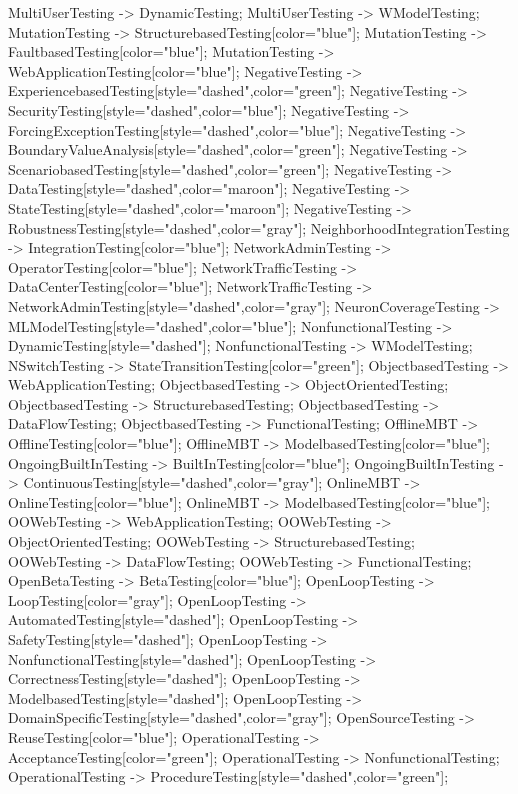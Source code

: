 \documentclass{article}
\begin{document}
{MultiUserTesting -> DynamicTesting;
MultiUserTesting -> WModelTesting;
MutationTesting -> StructurebasedTesting[color="blue"];
MutationTesting -> FaultbasedTesting[color="blue"];
MutationTesting -> WebApplicationTesting[color="blue"];
NegativeTesting -> ExperiencebasedTesting[style="dashed",color="green"];
NegativeTesting -> SecurityTesting[style="dashed",color="blue"];
NegativeTesting -> ForcingExceptionTesting[style="dashed",color="blue"];
NegativeTesting -> BoundaryValueAnalysis[style="dashed",color="green"];
NegativeTesting -> ScenariobasedTesting[style="dashed",color="green"];
NegativeTesting -> DataTesting[style="dashed",color="maroon"];
NegativeTesting -> StateTesting[style="dashed",color="maroon"];
NegativeTesting -> RobustnessTesting[style="dashed",color="gray"];
NeighborhoodIntegrationTesting -> IntegrationTesting[color="blue"];
NetworkAdminTesting -> OperatorTesting[color="blue"];
NetworkTrafficTesting -> DataCenterTesting[color="blue"];
NetworkTrafficTesting -> NetworkAdminTesting[style="dashed",color="gray"];
NeuronCoverageTesting -> MLModelTesting[style="dashed",color="blue"];
NonfunctionalTesting -> DynamicTesting[style="dashed"];
NonfunctionalTesting -> WModelTesting;
NSwitchTesting -> StateTransitionTesting[color="green"];
ObjectbasedTesting -> WebApplicationTesting;
ObjectbasedTesting -> ObjectOrientedTesting;
ObjectbasedTesting -> StructurebasedTesting;
ObjectbasedTesting -> DataFlowTesting;
ObjectbasedTesting -> FunctionalTesting;
OfflineMBT -> OfflineTesting[color="blue"];
OfflineMBT -> ModelbasedTesting[color="blue"];
OngoingBuiltInTesting -> BuiltInTesting[color="blue"];
OngoingBuiltInTesting -> ContinuousTesting[style="dashed",color="gray"];
OnlineMBT -> OnlineTesting[color="blue"];
OnlineMBT -> ModelbasedTesting[color="blue"];
OOWebTesting -> WebApplicationTesting;
OOWebTesting -> ObjectOrientedTesting;
OOWebTesting -> StructurebasedTesting;
OOWebTesting -> DataFlowTesting;
OOWebTesting -> FunctionalTesting;
OpenBetaTesting -> BetaTesting[color="blue"];
OpenLoopTesting -> LoopTesting[color="gray"];
OpenLoopTesting -> AutomatedTesting[style="dashed"];
OpenLoopTesting -> SafetyTesting[style="dashed"];
OpenLoopTesting -> NonfunctionalTesting[style="dashed"];
OpenLoopTesting -> CorrectnessTesting[style="dashed"];
OpenLoopTesting -> ModelbasedTesting[style="dashed"];
OpenLoopTesting -> DomainSpecificTesting[style="dashed",color="gray"];
OpenSourceTesting -> ReuseTesting[color="blue"];
OperationalTesting -> AcceptanceTesting[color="green"];
OperationalTesting -> NonfunctionalTesting;
OperationalTesting -> ProcedureTesting[style="dashed",color="green"];
}
\end{document}
